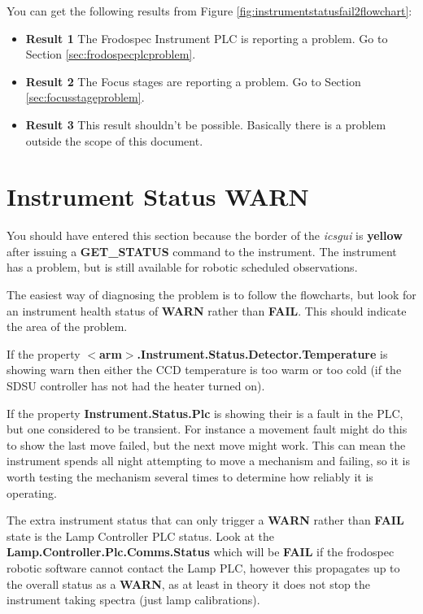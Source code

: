 \documentclass[10pt,a4paper]{article}
\begin{document}
You can get the following results from Figure \ref{fig:instrumentstatusfail2flowchart}:

\begin{itemize}
\item {\bf Result 1} The Frodospec Instrument PLC is reporting a problem. Go to Section \ref{sec:frodospecplcproblem}.
\item {\bf Result 2} The Focus stages are reporting a problem.  Go to Section \ref{sec:focusstageproblem}.
\item {\bf Result 3} This result shouldn't be possible. Basically there is a problem outside the scope of this document.
\end{itemize}

\section{Instrument Status WARN}
\label{sec:instrumentstatuswarn}

You should have entered this section because the border of the {\em icsgui} is {\bf yellow} after issuing a {\bf GET\_STATUS} command to the instrument. The instrument has a problem, but is still available for robotic scheduled observations.  

The easiest way of diagnosing the problem is to follow the flowcharts, but look for an instrument health status of {\bf WARN} rather than {\bf FAIL}. This should indicate the area of the problem.

If the property {\bf $<$arm$>$.Instrument.Status.Detector.Temperature} is showing warn then either the CCD temperature
is too warm or too cold (if the SDSU controller has not had the heater turned on).

If the property {\bf Instrument.Status.Plc} is showing their is a fault in the PLC, but one considered to be transient. For instance a movement fault might do this to show the last move failed, but the next move might work. This can mean the instrument spends all night attempting to move a mechanism and failing, so it is worth testing the mechanism several times to determine how reliably it is operating.

The extra instrument status that can only trigger a {\bf WARN} rather than {\bf FAIL} state is the Lamp Controller PLC
status. Look at the {\bf Lamp.Controller.Plc.Comms.Status} which will be {\bf FAIL} if the frodospec robotic software cannot contact the Lamp PLC, however this propagates up to the overall status as a {\bf WARN}, as at least in theory it
does not stop the instrument taking spectra (just lamp calibrations).
\end{document}
